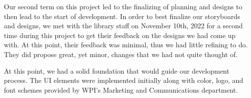 Our second term on this project led to the finalizing of planning and designs to then lead to the start of development. In order to best finalize our storyboards and designs, we met with the library staff on November 10th, 2022 for a second time during this project to get their feedback on the designs we had come up with. At this point, their feedback was minimal, thus we had little refining to do. They did propose great, yet minor, changes that we had not quite thought of.

At this point, we had a solid foundation that would guide our development process. The UI elements were implemented initially along with color, logo, and font schemes provided by WPI's Marketing and Communications department.
